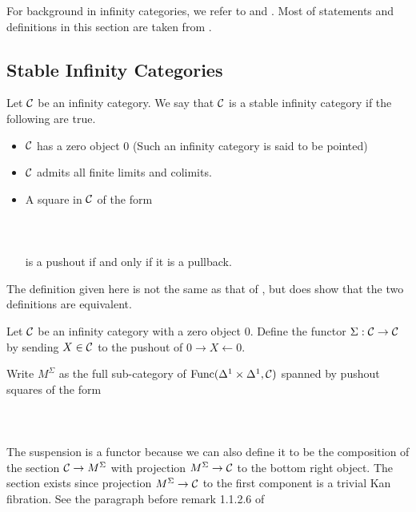 For background in infinity categories, we refer to \cite{HTT} and \cite{Kerodon}. Most of statements and definitions in this section are taken from \cite{HA}. 

\subsection{Stable Infinity Categories}
\begin{defn}\label{defn:SIC} Let $\mathcal{C}$ be an infinity category. We say that $\mathcal{C}$ is a stable infinity category if the following are true. 
\begin{itemize}
\item $\mathcal{C}$ has a zero object $0$ (Such an infinity category is said to be pointed)
\item $\mathcal{C}$ admits all finite limits and colimits. 
\item A square in $\mathcal{C}$ of the form  
 \\~\\  \\~\\
is a pushout if and only if it is a pullback. 
\end{itemize}
\end{defn}

The definition given here is not the same as that of \cite{HA}, but \cite{HA} does show that the two definitions are equivalent. 

\begin{defn}\label{defn:ISus} Let $\mathcal{C}$ be an infinity category with a zero object $0$. Define the functor $\Sigma:\mathcal{C}\to\mathcal{C}$ by sending $X\in\mathcal{C}$ to the pushout of $0\rightarrow X\leftarrow 0$. 
\end{defn}

Write $M^\Sigma$ as the full sub-category of $\text{Func}(\Delta^1\times\Delta^1,\mathcal{C})$ spanned by pushout squares of the form  
 \\~\\  \\~\\
The suspension is a functor because we can also define it to be the composition of the section $\mathcal{C}\to M^\Sigma$ with projection $M^\Sigma\to\mathcal{C}$ to the bottom right object. The section exists since projection $M^\Sigma\to\mathcal{C}$ to the first component is a trivial Kan fibration. See the paragraph before remark 1.1.2.6 of \cite{HA}

